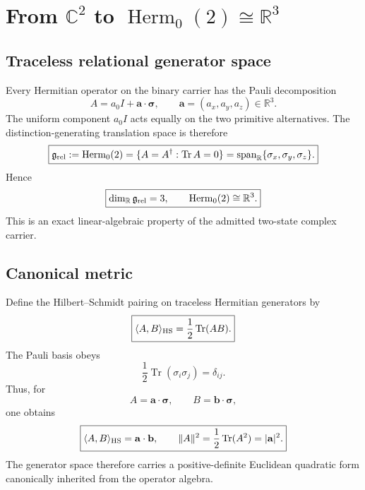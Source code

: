 \chapter[C2 to Herm0(2) and R3]{From $\mathbb C^2$ to $\operatorname{Herm}_0(2)\cong\mathbb R^3$}
\label{ch:v12_c2_herm0_r3}

\section{Traceless relational generator space}

Every Hermitian operator on the binary carrier has the Pauli decomposition
\begin{equation}
A=a_0I+\mathbf a\cdot\boldsymbol\sigma,
\qquad
\mathbf a=(a_x,a_y,a_z)\in\mathbb R^3.
\end{equation}
The uniform component $a_0I$ acts equally on the two primitive alternatives. The distinction-generating translation space is therefore
\begin{equation}
\boxed{
\mathfrak g_{\rm rel}
:=\operatorname{Herm}_0(2)
=\{A=A^\dagger:\operatorname{Tr}A=0\}
=\operatorname{span}_{\mathbb R}\{\sigma_x,\sigma_y,\sigma_z\}.
}
\label{eq:v12_herm0_def}
\end{equation}
Hence
\begin{equation}
\boxed{
\dim_{\mathbb R}\mathfrak g_{\rm rel}=3,
\qquad
\operatorname{Herm}_0(2)\cong\mathbb R^3.
}
\label{eq:v12_herm0_r3}
\end{equation}
This is an exact linear-algebraic property of the admitted two-state complex carrier.

\section{Canonical metric}

Define the Hilbert--Schmidt pairing on traceless Hermitian generators by
\begin{equation}
\boxed{
\langle A,B\rangle_{\rm HS}
=\frac12\operatorname{Tr}(AB).
}
\label{eq:v12_hs_metric}
\end{equation}
The Pauli basis obeys
\begin{equation}
\frac12\operatorname{Tr}(\sigma_i\sigma_j)=\delta_{ij}.
\end{equation}
Thus, for
\[
A=\mathbf a\cdot\boldsymbol\sigma,
\qquad
B=\mathbf b\cdot\boldsymbol\sigma,
\]
one obtains
\begin{equation}
\boxed{
\langle A,B\rangle_{\rm HS}=\mathbf a\cdot\mathbf b,
\qquad
\|A\|^2=\frac12\operatorname{Tr}(A^2)=|\mathbf a|^2.
}
\label{eq:v12_hs_euclidean}
\end{equation}
The generator space therefore carries a positive-definite Euclidean quadratic form canonically inherited from the operator algebra.

